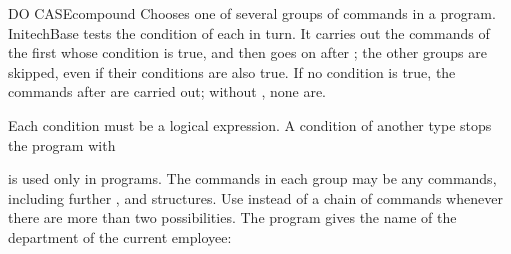 \begin{XbaseEntry}{DO CASE}{compound}
%
Chooses one of several groups of commands in a program.
\Syntax
{}
\SyntaxLine{\rep}
\Usage
InitechBase tests the condition of each  in turn.  It carries out
the commands of the first  whose condition is true, and then goes on
after ; the other  groups are skipped, even if their
conditions are also true.  If no condition is true, the commands after
 are carried out; without , none are.

Each condition must be a logical expression.  A condition of another type
stops the program with 

 is used only in programs.  The commands in each group may be any
commands, including further ,  and 
structures.
\Tips
Use  instead of a chain of  commands whenever there are
more than two possibilities.
\Examples
The program  gives the name of the department of the
current employee:
\end{XbaseEntry}

